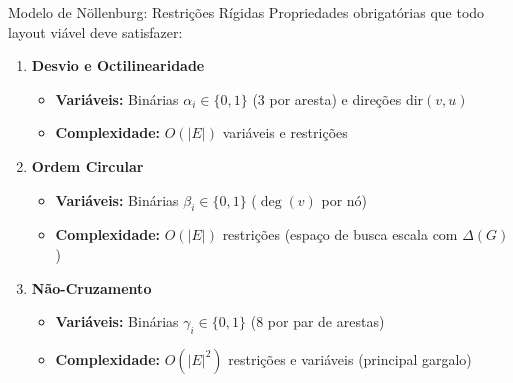 \documentclass{beamer}
\begin{document}
\begin{frame}{Modelo de Nöllenburg: Restrições Rígidas}
  Propriedades obrigatórias que todo layout viável deve satisfazer:

  \vspace{0.25cm}
  \begin{enumerate}
    \item \textbf{Desvio e Octilinearidade}
      \begin{itemize}
        \item \textbf{Variáveis:} Binárias $\alpha_i \in \{0, 1\}$ (3 por aresta) e direções $\text{dir}(v, u)$
        \item \textbf{Complexidade:} $O(|E|)$ variáveis e restrições
      \end{itemize}

    \vspace{0.15cm}
    \item \textbf{Ordem Circular}
      \begin{itemize}
        \item \textbf{Variáveis:} Binárias $\beta_i \in \{0, 1\}$ ($\deg(v)$ por nó)
        \item \textbf{Complexidade:} $O(|E|)$ restrições (espaço de busca escala com $\Delta(G)$)
      \end{itemize}

    \vspace{0.15cm}
    \item \textbf{Não-Cruzamento}
      \begin{itemize}
        \item \textbf{Variáveis:} Binárias $\gamma_i \in \{0, 1\}$ (8 por par de arestas)
        \item \textbf{Complexidade:} \alert{$O(|E|^2)$} restrições e variáveis (principal gargalo)
      \end{itemize}
  \end{enumerate}
\end{frame}
\end{document}
